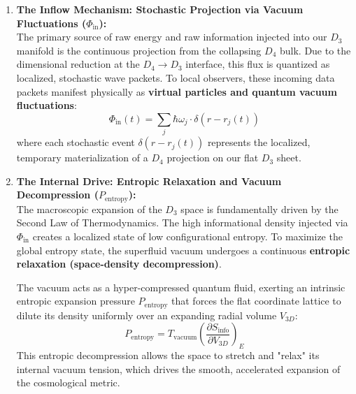\documentclass[11pt,a4paper]{article}
\theoremstyle{plain}
\theoremstyle{definition}
\theoremstyle{remark}
\begin{document}
\begin{enumerate}
    \item \textbf{The Inflow Mechanism: Stochastic Projection via Vacuum Fluctuations ($\Phi_{\text{in}}$):} \\
    The primary source of raw energy and raw information injected into our $D_3$ manifold is the continuous projection from the collapsing $D_4$ bulk. Due to the dimensional reduction at the $D_4 \to D_3$ interface, this flux is quantized as localized, stochastic wave packets. To local observers, these incoming data packets manifest physically as \textbf{virtual particles and quantum vacuum fluctuations}:
    \begin{equation}
    \Phi_{\text{in}}(t) = \sum_{j} \hbar \omega_j \cdot \delta(r - r_j(t))
    \end{equation}
    where each stochastic event $\delta(r - r_j(t))$ represents the localized, temporary materialization of a $D_4$ projection on our flat $D_3$ sheet.

    \item \textbf{The Internal Drive: Entropic Relaxation and Vacuum Decompression ($P_{\text{entropy}}$):} \\
    The macroscopic expansion of the $D_3$ space is fundamentally driven by the Second Law of Thermodynamics. The high informational density injected via $\Phi_{\text{in}}$ creates a localized state of low configurational entropy. To maximize the global entropy state, the superfluid vacuum undergoes a continuous \textbf{entropic relaxation (space-density decompression)}. 
    
    The vacuum acts as a hyper-compressed quantum fluid, exerting an intrinsic entropic expansion pressure $P_{\text{entropy}}$ that forces the flat coordinate lattice to dilute its density uniformly over an expanding radial volume $V_{3D}$:
    \begin{equation}
    P_{\text{entropy}} = T_{\text{vacuum}} \left( \frac{\partial S_{\text{info}}}{\partial V_{3D}} \right)_{E}
    \end{equation}
    This entropic decompression allows the space to stretch and "relax" its internal vacuum tension, which drives the smooth, accelerated expansion of the cosmological metric.


\end{enumerate}
\end{document}
